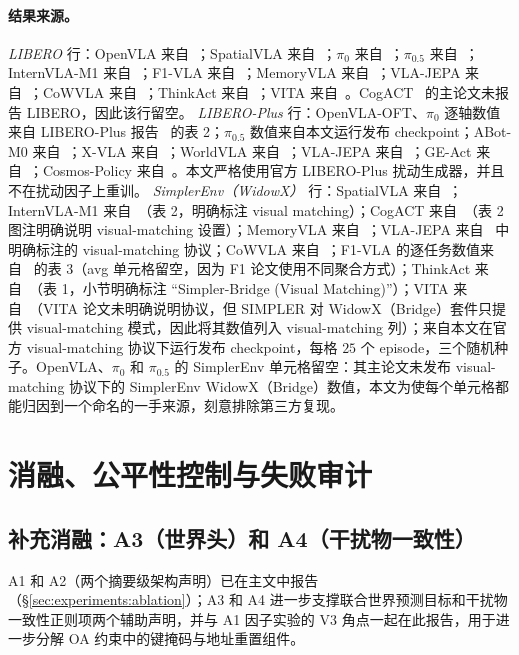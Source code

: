\paragraph{结果来源。}
\emph{LIBERO} 行：OpenVLA 来自~\citep{openvla}；SpatialVLA 来自~\citep{spatialvla}；$\pi_0$ 来自~\citep{pi0}；$\pi_{0.5}$ 来自~\citep{pi05}；InternVLA-M1 来自~\citep{internvlam1}；F1-VLA 来自~\citep{f1vla}；MemoryVLA 来自~\citep{memoryvla}；VLA-JEPA 来自~\citep{vlajepa}；CoWVLA 来自~\citep{cowvla}；ThinkAct 来自~\citep{thinkact}；VITA 来自~\citep{vita}。CogACT~\citep{cogact} 的主论文未报告 LIBERO，因此该行留空。
\emph{LIBERO-Plus} 行：OpenVLA-OFT、$\pi_0$ 逐轴数值来自 LIBERO-Plus 报告~\citep{liberoplus} 的表 2；$\pi_{0.5}$ 数值来自本文运行发布 checkpoint；ABot-M0 来自~\citep{abotm0}；X-VLA 来自~\citep{xvla}；WorldVLA 来自~\citep{worldvla}；VLA-JEPA 来自~\citep{vlajepa}；GE-Act 来自~\citep{geact}；Cosmos-Policy 来自~\citep{cosmospolicy}。本文严格使用官方 LIBERO-Plus 扰动生成器，并且不在扰动因子上重训。
\emph{SimplerEnv（WidowX）} 行：SpatialVLA 来自~\citep{spatialvla}；InternVLA-M1 来自~\citep{internvlam1}（表 2，明确标注 visual matching）；CogACT 来自~\citep{cogact}（表 2 图注明确说明 visual-matching 设置）；MemoryVLA 来自~\citep{memoryvla}；VLA-JEPA 来自~\citep{vlajepa} 中明确标注的 visual-matching 协议；CoWVLA 来自~\citep{cowvla}；F1-VLA 的逐任务数值来自~\citep{f1vla} 的表 3（avg 单元格留空，因为 F1 论文使用不同聚合方式）；ThinkAct 来自~\citep{thinkact}（表 1，小节明确标注 ``Simpler-Bridge (Visual Matching)''）；VITA 来自~\citep{vita}（VITA 论文未明确说明协议，但 SIMPLER 对 WidowX（Bridge）套件只提供 visual-matching 模式，因此将其数值列入 visual-matching 列）；\method{}来自本文在官方 visual-matching 协议下运行发布 checkpoint，每格 $25$ 个 episode，三个随机种子。OpenVLA、$\pi_0$ 和 $\pi_{0.5}$ 的 SimplerEnv 单元格留空：其主论文未发布 visual-matching 协议下的 SimplerEnv WidowX（Bridge）数值，本文为使每个单元格都能归因到一个命名的一手来源，刻意排除第三方复现。

\section{消融、公平性控制与失败审计}
\label{app:ablations}
\label{app:fairness}

\subsection*{补充消融：A3（世界头）和 A4（干扰物一致性）}

A1 和 A2（两个摘要级架构声明）已在主文中报告（\S\ref{sec:experiments:ablation}）；A3 和 A4 进一步支撑联合世界预测目标和干扰物一致性正则项两个辅助声明，并与 A1 因子实验的 V3 角点一起在此报告，用于进一步分解 OA 约束中的键掩码与地址重置组件。

